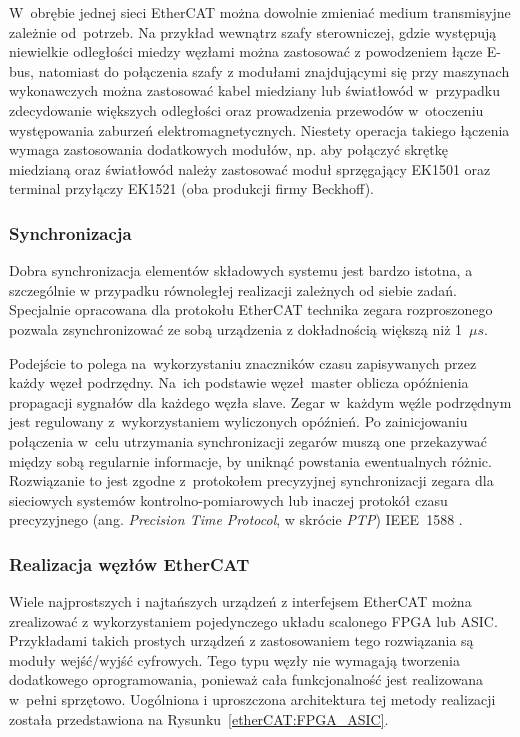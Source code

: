 W~obrębie jednej sieci EtherCAT można dowolnie zmieniać medium transmisyjne zależnie od~potrzeb. Na przykład wewnątrz szafy sterowniczej, gdzie występują niewielkie odległości miedzy węzłami można zastosować z powodzeniem łącze E-bus, natomiast do połączenia szafy z modułami znajdującymi się przy maszynach wykonawczych można zastosować kabel miedziany lub światłowód w~przypadku zdecydowanie większych odległości oraz prowadzenia przewodów w~otoczeniu występowania zaburzeń elektromagnetycznych. Niestety operacja takiego łączenia wymaga zastosowania dodatkowych modułów, np. aby połączyć skrętkę miedzianą oraz światłowód należy zastosować moduł sprzęgający EK1501 oraz terminal przyłączy EK1521 (oba produkcji firmy Beckhoff).

\subsubsection{Synchronizacja}
Dobra synchronizacja elementów składowych systemu jest bardzo istotna, a szczególnie w przypadku równoległej realizacji zależnych od siebie zadań. Specjalnie opracowana dla protokołu EtherCAT technika zegara rozproszonego pozwala zsynchronizować ze sobą urządzenia z dokładnością większą niż 1~$\mu s$. 

Podejście to polega na~wykorzystaniu znaczników czasu zapisywanych przez każdy węzeł podrzędny. Na~ich podstawie węzeł~master oblicza opóźnienia propagacji sygnałów dla każdego węzła slave. Zegar w~każdym węźle podrzędnym jest regulowany z~wykorzystaniem wyliczonych opóźnień. Po zainicjowaniu połączenia w~celu utrzymania synchronizacji zegarów muszą one przekazywać między sobą regularnie informacje, by uniknąć powstania ewentualnych różnic. Rozwiązanie to jest zgodne z~protokołem precyzyjnej synchronizacji zegara dla sieciowych systemów kontrolno-pomiarowych lub inaczej protokół czasu precyzyjnego (ang. \textit{Precision Time Protocol}, w skrócie \textit{PTP}) IEEE~1588 \cite{ieee}.

\subsubsection{Realizacja węzłów EtherCAT}
Wiele najprostszych i najtańszych urządzeń z interfejsem EtherCAT można zrealizować z wykorzystaniem pojedynczego układu scalonego FPGA lub ASIC. Przykładami takich prostych urządzeń z zastosowaniem tego rozwiązania są moduły wejść/wyjść cyfrowych. Tego typu węzły nie wymagają tworzenia dodatkowego oprogramowania, ponieważ cała funkcjonalność jest realizowana w~pełni sprzętowo. Uogólniona i uproszczona architektura tej metody realizacji została przedstawiona na Rysunku~\ref{etherCAT:FPGA_ASIC}.

